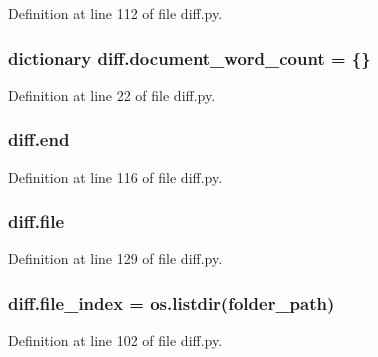 Definition at line 112 of file diff.\+py.

\subsubsection[{\texorpdfstring{document\+\_\+word\+\_\+count}{document_word_count}}]{\setlength{\rightskip}{0pt plus 5cm}dictionary diff.\+document\+\_\+word\+\_\+count = \{\}}\hypertarget{namespacediff_af16edaaafe4787892cb925870fd0d108}{}\label{namespacediff_af16edaaafe4787892cb925870fd0d108}


Definition at line 22 of file diff.\+py.

\subsubsection[{\texorpdfstring{end}{end}}]{\setlength{\rightskip}{0pt plus 5cm}diff.\+end}\hypertarget{namespacediff_a2839fdf2e0df35c347f0649098c5ecdc}{}\label{namespacediff_a2839fdf2e0df35c347f0649098c5ecdc}


Definition at line 116 of file diff.\+py.

\subsubsection[{\texorpdfstring{file}{file}}]{\setlength{\rightskip}{0pt plus 5cm}diff.\+file}\hypertarget{namespacediff_a3759e132757b6fdecd117a665d6158ab}{}\label{namespacediff_a3759e132757b6fdecd117a665d6158ab}


Definition at line 129 of file diff.\+py.

\subsubsection[{\texorpdfstring{file\+\_\+index}{file_index}}]{\setlength{\rightskip}{0pt plus 5cm}diff.\+file\+\_\+index = os.\+listdir({\bf folder\+\_\+path})}\hypertarget{namespacediff_a9c223d5f0415c68743de6a689c3bea0b}{}\label{namespacediff_a9c223d5f0415c68743de6a689c3bea0b}


Definition at line 102 of file diff.\+py.

